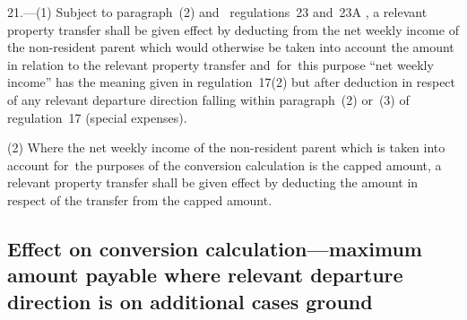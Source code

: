 \documentclass[12pt,a4paper]{article}
\begin{document}
21.---(1)  Subject to paragraph~(2) and~
regulations~23 and~23A%
, a relevant property transfer shall be given effect by deducting from the net weekly income of the non-resident parent which would otherwise be taken into account the amount in relation to the relevant property transfer and~for~this purpose “net weekly income” has the meaning given in regulation~17(2) but after deduction in respect of any relevant departure direction falling within paragraph~(2) or~(3) of regulation~17 (special expenses).

(2) Where the net weekly income of the non-resident parent which is taken into account for~the purposes of the conversion calculation is the capped amount, a relevant property transfer shall be given effect by deducting the amount in respect of the transfer from the capped amount.


\vfill

\subsection[22. Effect on conversion calculation—maximum amount payable where relevant departure direction is on additional cases ground]{\sloppy Effect on conversion calculation—maximum amount payable where relevant departure direction is on additional cases ground}
\end{document}
